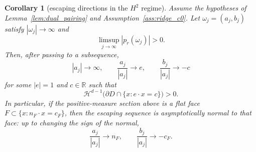 \documentclass[11pt]{amsart}
\newtheorem{corollary}[theorem]{Corollary}
\theoremstyle{definition}
\theoremstyle{remark}
\begin{document}
\begin{corollary}[escaping directions in the $H^2$ regime]\label{cor:flat_face_escape}
Assume the hypotheses of Lemma~\ref{lem:dual_pairing} and
Assumption~\ref{ass:ridge_c0}. Let $\omega_j=(a_j,b_j)$ satisfy
$|\omega_j|\to\infty$ and
\begin{equation*}
	\limsup_{j\to\infty}|p_r(\omega_j)|>0.
\end{equation*}
Then, after passing to a subsequence,
\begin{equation*}
	|a_j|\to\infty,\qquad \frac{a_j}{|a_j|}\to e,\qquad
	\frac{b_j}{|a_j|}\to -c
\end{equation*}
for some $|e|=1$ and $c\in\mathbb{R}$ such that
\begin{equation*}
	\mathcal{H}^{d-1}\big(\partial D\cap\{x:e\cdot x=c\}\big)>0.
\end{equation*}
In particular, if the positive-measure section above is a flat face
$F\subset\{x:n_F\cdot x=c_F\}$, then the escaping sequence is asymptotically
normal to that face: up to changing the sign of the normal,
\begin{equation*}
	\frac{a_j}{|a_j|}\to n_F,\qquad
	\frac{b_j}{|a_j|}\to -c_F.
\end{equation*}
\end{corollary}
\end{document}
